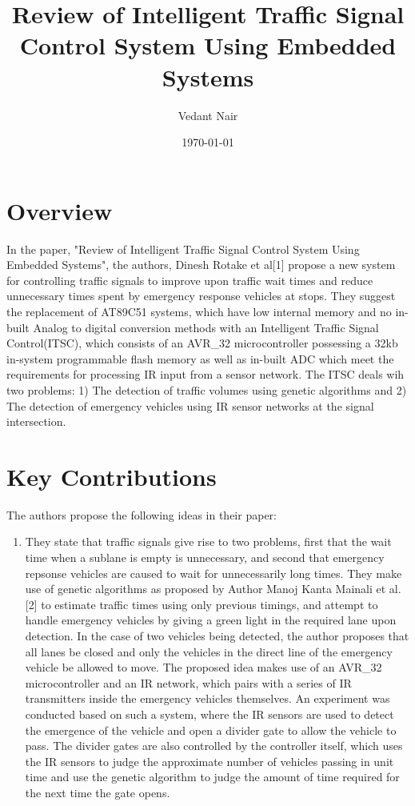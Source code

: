 \documentclass{report}
\title{Review of Intelligent Traffic Signal Control System Using Embedded Systems}
\author{Vedant Nair}
\date{\today}
\begin{document}

\section{Overview}



	In the paper, "Review of Intelligent Traffic Signal Control System Using Embedded Systems", the authors, Dinesh Rotake et al[1] propose a new system for controlling traffic signals to improve upon traffic wait times and reduce unnecessary times spent by emergency response vehicles at stops. They suggest the replacement of AT89C51 systems, which have low internal memory and no in-built Analog to digital conversion methods with an Intelligent Traffic Signal Control(ITSC), which  consists of an AVR_32 microcontroller possessing a 32kb in-system programmable flash memory as well as in-built ADC which meet the requirements for processing IR input from a sensor network. The ITSC deals wih two problems: 1) The detection of traffic volumes using genetic algorithms and 2) The detection of emergency vehicles using IR sensor networks at the signal intersection.


\section*{Key Contributions}
	The authors propose the following ideas in their paper:
\begin{enumerate}
	\item They state that traffic signals give rise to two problems, first that the wait time when a sublane is empty is unnecessary, and second that emergency repsonse vehicles are caused to wait for unnecessarily long times.
	\items They make use of genetic algorithms as proposed by Author Manoj Kanta Mainali et al.[2] to estimate traffic times using only previous timings, and attempt to handle emergency vehicles by giving a green light in the required lane upon detection. In the case of two vehicles being detected, the author proposes that all lanes be closed and only the vehicles in the direct line of the emergency vehicle be allowed to move.
	\items The proposed idea makes use of an AVR_32 microcontroller and an IR network, which pairs with a series of IR transmitters inside the emergency vehicles themselves. 
	\items An experiment was conducted based on such a system, where the IR sensors are used to detect the emergence of the vehicle and open a divider gate to allow the vehicle to pass. The divider gates are also controlled by the controller itself, which uses the IR sensors to judge the approximate number of vehicles passing in unit time and use the genetic algorithm to judge the amount of time required for the next time the gate opens.
\end{enumerate}
\end{document}
